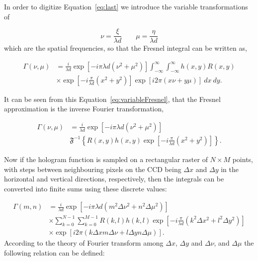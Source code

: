     In order to digitize Equation~\ref{eq:last} we introduce the variable
    transformations of

    \begin{equation}
        \nu = \frac{\xi}{\lambda d} \qquad \mu = \frac{\eta}{\lambda d}
        \label{eq:original}
    \end{equation}
    which are the spatial frequencies, so that the Fresnel integral can be
    written as,

    \begin{equation}
        \begin{aligned}
        \Gamma(\nu,\mu) &= \frac{i}{\lambda d}
        \exp\left[ -i\pi\lambda d(\nu^2+\mu^2) \right] 
        \int_{-\infty}^{\infty}\int_{-\infty}^{\infty}h(x,y)R(x,y) \\
        &\times \exp\left[ -i\frac{\pi}{\lambda d}\left(
        x^{2}+y^{2} \right) \right]
        \exp\left[ i2\pi\left(
        x\nu+y\mu \right) \right]~dx~dy.
        \end{aligned}
        \label{eq:variableFresnel}
    \end{equation}

    It can be seen from this Equation~\ref{eq:variableFresnel}, that the Fresnel approximation is the
    inverse Fourier transformation,

    \begin{equation}
    \begin{aligned}
        \Gamma(\nu,\mu)&=\frac{i}{\lambda d}\exp\left[ -i\pi\lambda d\left(
            \nu^2+\mu^2
        \right) \right] \\
        & \mathfrak{F}^{-1}\left\{R(x,y)h(x,y)\exp\left[
            -i\frac{\pi}{\lambda d}(x^{2}+y^2)
        \right] \right\} .
    \end{aligned}
    \label{eq:FFTneeded}
    \end{equation}

    Now if the hologram function is sampled on a rectangular raster of $N\times M $
    points, with steps between neighbouring pixels on the CCD being $\Delta x$ and $\Delta
    y$ in the horizontal and vertical directions, respectively, then the
    integrals can be converted into finite sums using these discrete values:

    \begin{equation}
    \begin{aligned}
        \Gamma(m,n) &= \frac{i}{\lambda d}\exp\left[ -i\pi \lambda d\left(
            m^2\Delta \nu^2 + n^2\Delta \mu^2
        \right)\right]\\
        & \times
        \sum_{k=0}^{N-1}\sum_{k=0}^{M-1}R(k,l)h(k,l)\exp\left[ -i
        \frac{\pi}{\lambda d}\left( k^2\Delta x^2+l^2\Delta y^2 \right)
    \right] \\
    & \times \exp\left[ i2\pi\left( k\Delta x m \Delta\nu+l\Delta y n
    \Delta\mu \right) \right] .
    \end{aligned}
    \label{eq:discrete}
    \end{equation}
    According to the theory of Fourier transform among $\Delta x$, $\Delta y$
    and $\Delta\nu$, and $\Delta\mu$ the following relation can be defined:

